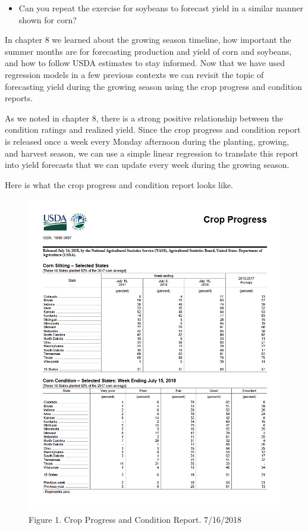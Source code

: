 \documentclass[
  letterpaper,
  DIV=11,
  numbers=noendperiod]{scrreprt}
\providecommand{\tightlist}{%
  \setlength{\itemsep}{0pt}\setlength{\parskip}{0pt}}\usepackage{longtable,booktabs,array}
\begin{document}
\begin{itemize}
\tightlist
\item
  Can you repeat the exercise for soybeans to forecast yield in a
  similar manner shown for corn?
\end{itemize}

In chapter 8 we learned about the growing season timeline, how important
the summer months are for forecasting production and yield of corn and
soybeans, and how to follow USDA estimates to stay informed. Now that we
have used regression models in a few previous contexts we can revisit
the topic of forecasting yield during the growing season using the crop
progress and condition reports.

As we noted in chapter 8, there is a strong positive relationship
between the condition ratings and realized yield. Since the crop
progress and condition report is released once a week every Monday
afternoon during the planting, growing, and harvest season, we can use a
simple linear regression to translate this report into yield forecasts
that we can update every week during the growing season.

Here is what the crop progress and condition report looks like.

\begin{figure}

{\centering \includegraphics{images/cropprogress.png}

}

\caption{Figure 1. Crop Progress and Condition Report. 7/16/2018}

\end{figure}
\end{document}
